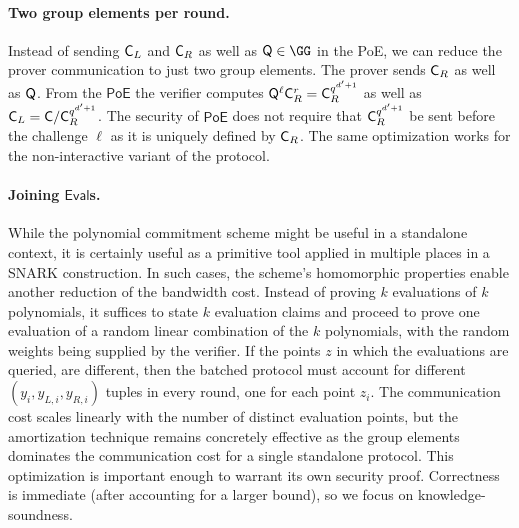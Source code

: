 \documentclass{article}
\theoremstyle{definition}
\begin{document}
\paragraph{Two group elements per round.} Instead of sending $\mathsf{C}_L$ and $\mathsf{C}_R$ as well as $\gr{Q}\in \GG$ in the \textsf{PoE}, we can reduce the prover communication to just two group elements. The prover sends $\mathsf{C}_R$ as well as $\mathsf{Q}$. From the $\textsf{PoE}$ the verifier computes $\mathsf{Q}^{\ell} \mathsf{C}_R^r=\mathsf{C}_R^{q^{d'+1}}$ as well as $\mathsf{C}_L=\mathsf{C}/\mathsf{C}_R^{q^{d'+1}}$. The security of $\textsf{PoE}$ does not require that $\mathsf{C}_R^{q^{d'+1}}$ be sent before the challenge $\ell$ as it is uniquely defined by $\mathsf{C}_R$.
The same optimization works for the non-interactive variant of the protocol. 

\paragraph{Joining $\mathsf{Eval}$s.} While the polynomial commitment scheme might be useful in a standalone context, it is certainly useful as a primitive tool applied in multiple places in a SNARK construction. In such cases, the scheme's homomorphic properties enable another reduction of the bandwidth cost. Instead of proving $k$ evaluations of $k$ polynomials, it suffices to state $k$ evaluation claims and proceed to prove one evaluation of a random linear combination of the $k$ polynomials, with the random weights being supplied by the verifier. If the points $z$ in which the evaluations are queried, are different, then the batched protocol must account for different $(y_i, y_{L,i}, y_{R,i})$ tuples in every round, one for each point $z_i$. The communication cost scales linearly with the number of distinct evaluation points, but the amortization technique remains concretely effective as the group elements dominates the communication cost for a single standalone protocol. This optimization is important enough to warrant its own security proof. Correctness is immediate (after accounting for a larger bound), so we focus on knowledge-soundness.
\end{document}
